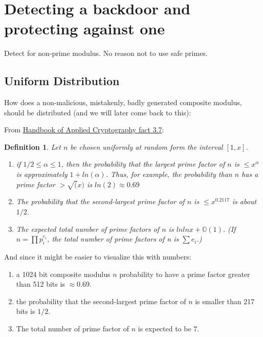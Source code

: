 \documentclass[a4paper,11pt,twocolumn]{article}
\newtheorem{definition}{Definition}
\begin{document}
\section{Detecting a backdoor and protecting against one}

Detect for non-prime modulus. No reason not to use safe primes.

\subsection{Uniform Distribution}

How does a non-malicious, mistakenly, badly generated composite modulus, should be distributed (and we will later come back to this):

From \href{http://cacr.uwaterloo.ca/hac/about/chap3.pdf}{Handbook of Applied Cryptography fact 3.7}:

\begin{definition}
    Let $n$ be chosen uniformly at random form the interval $[1, x]$.
    \begin{enumerate}
        \item if $1/2 \leq \alpha \leq 1$, then the probability that the largest prime factor of $n$ is $\leq x^{\alpha}$ is approximately $1+ ln(\alpha)$. Thus, for example, the probability than $n$ has a prime factor $> \sqrt(x)$ is $ln(2) \approx 0.69$
        \item The probability that the second-largest prime factor of $n$ is $\leq x^{0.2117}$ is about $1/2$. 
        \item The expected total number of prime factors of $n$ is $ln ln x + \mathbb{O}(1)$. (If $n = \prod p_i^{e_i}$, the total number of prime factors of n is $\sum e_i$.)
    \end{enumerate} 
\end{definition}

And since it might be easier to visualize this with numbers:

\begin{enumerate}
    \item a 1024 bit composite modulus $n$ probability to have a prime factor greater than 512 bits is $\approx 0.69$.
    \item the probability that the second-largest prime factor of $n$ is smaller than 217 bits is $1/2$.
    \item The total number of prime factor of $n$ is expected to be $7$.
\end{enumerate}
\end{document}
